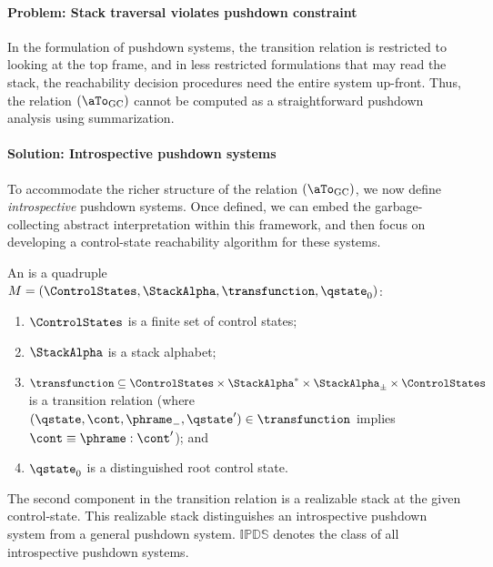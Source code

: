 \paragraph{Problem: Stack traversal violates pushdown constraint}

In the formulation of pushdown systems, the transition relation is restricted
to looking at the top frame, and in less restricted formulations that may read the stack,
the reachability decision procedures need the entire system up-front.
Thus, the relation $(\aTo_{\mathrm{GC}})$ cannot be computed as
a straightforward pushdown analysis using summarization.


\paragraph{Solution: Introspective pushdown systems}
To accommodate the richer structure of the relation $(\aTo_{\mathrm{GC}})$, we
now define \emph{introspective} pushdown systems.
Once defined, we can embed the garbage-collecting abstract interpretation
within this framework, and then focus on developing a control-state
reachability algorithm for these systems.


An  is a quadruple
$M = (\ControlStates,\StackAlpha,\transfunction,\qstate_0)$:
\begin{enumerate}

\item $\ControlStates$ is a finite set of control states;

\item $\StackAlpha$ is a stack alphabet; 

\item $\transfunction \subseteq \ControlStates \times \StackAlpha^*
\times \StackAlpha_\pm \times \ControlStates$ is a transition relation (where $(\qstate, \cont, \phrame_-, \qstate') \in \transfunction$ implies $\cont \equiv \phrame:\cont'$); and

\item $\qstate_0$ is a distinguished root control state. 
\end{enumerate}
The second component in the transition relation is 
a realizable stack at the given control-state.
This realizable stack distinguishes an introspective pushdown system
from a general pushdown system.
$\mathbb{IPDS}$  denotes the class of all introspective pushdown
systems.



